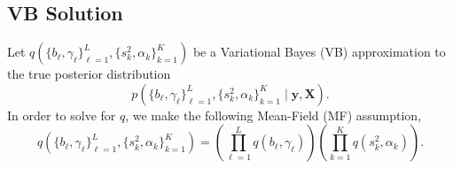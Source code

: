 \documentclass{article}
\begin{document}
\subsection{VB Solution}

Let $q\left(\{b_\ell,\gamma_\ell\}_{\ell=1}^L,\{s^2_k,\alpha_k\}_{k=1}^K\right)$ be a Variational Bayes (VB) approximation to the true posterior distribution $$p\left(\{b_\ell,\gamma_\ell\}_{\ell=1}^L,\{s^2_k,\alpha_k\}_{k=1}^K\;|\; \mathbf{y}, \mathbf{X}\right).$$ In order to solve for $q$, we make the following Mean-Field (MF) assumption, 
\begin{equation}\label{eq:mean-field}
    q\left(\{b_\ell,\gamma_\ell\}_{\ell=1}^L,\{s^2_k,\alpha_k\}_{k=1}^K\right) = \left(\prod_{\ell=1}^Lq(b_\ell,\gamma_\ell)\right)\left(\prod_{k=1}^K q(s^2_k,\alpha_k)\right).
\end{equation}
\end{document}
